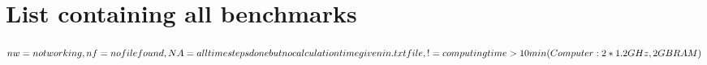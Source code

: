 
%
\appendix
\chapter{List containing all benchmarks}
$nw= not working, nf= no file found, NA= all time steps done 
\linebreak but no calculation time given in .txt file, 
\linebreak != computing time > 10 min (Computer: 2*1.2 GHz, 2GB RAM)$
